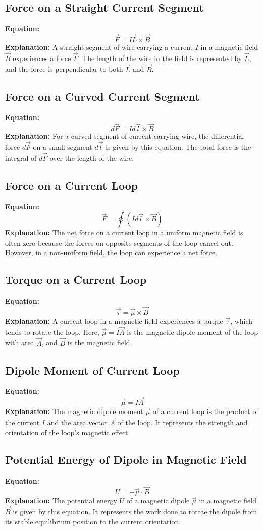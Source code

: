 \documentclass{article}
\begin{document}
\subsection*{Force on a Straight Current Segment}
\textbf{Equation:} 
\[ \vec{F} = I\vec{L} \times \vec{B} \]
\textbf{Explanation:} 
A straight segment of wire carrying a current \( I \) in a magnetic field \( \vec{B} \) experiences a force \( \vec{F} \). The length of the wire in the field is represented by \( \vec{L} \), and the force is perpendicular to both \( \vec{L} \) and \( \vec{B} \).

\subsection*{Force on a Curved Current Segment}
\textbf{Equation:} 
\[ d\vec{F} = I d\vec{l} \times \vec{B} \]
\textbf{Explanation:} 
For a curved segment of current-carrying wire, the differential force \( d\vec{F} \) on a small segment \( d\vec{l} \) is given by this equation. The total force is the integral of \( d\vec{F} \) over the length of the wire.

\subsection*{Force on a Current Loop}
\textbf{Equation:} 
\[ \vec{F} = \oint (I d\vec{l} \times \vec{B}) \]
\textbf{Explanation:} 
The net force on a current loop in a uniform magnetic field is often zero because the forces on opposite segments of the loop cancel out. However, in a non-uniform field, the loop can experience a net force.

\subsection*{Torque on a Current Loop}
\textbf{Equation:} 
\[ \vec{\tau} = \vec{\mu} \times \vec{B} \]
\textbf{Explanation:} 
A current loop in a magnetic field experiences a torque \( \vec{\tau} \), which tends to rotate the loop. Here, \( \vec{\mu} = I\vec{A} \) is the magnetic dipole moment of the loop with area \( \vec{A} \), and \( \vec{B} \) is the magnetic field.

\subsection*{Dipole Moment of Current Loop}
\textbf{Equation:} 
\[ \vec{\mu} = I\vec{A} \]
\textbf{Explanation:} 
The magnetic dipole moment \( \vec{\mu} \) of a current loop is the product of the current \( I \) and the area vector \( \vec{A} \) of the loop. It represents the strength and orientation of the loop's magnetic effect.

\subsection*{Potential Energy of Dipole in Magnetic Field}
\textbf{Equation:} 
\[ U = -\vec{\mu} \cdot \vec{B} \]
\textbf{Explanation:} 
The potential energy \( U \) of a magnetic dipole \( \vec{\mu} \) in a magnetic field \( \vec{B} \) is given by this equation. It represents the work done to rotate the dipole from its stable equilibrium position to the current orientation.
\end{document}
